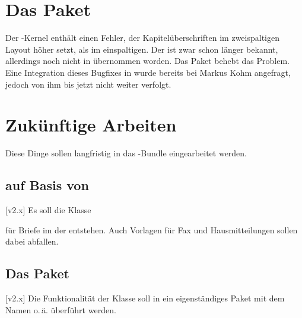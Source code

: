 \section{Das Paket }
%
%
%
Der -Kernel enthält einen Fehler, der Kapitelüberschriften im
zweispaltigen Layout höher setzt, als im einspaltigen. Der 
ist zwar schon länger bekannt, allerdings noch nicht in  
übernommen worden. Das Paket  behebt das Problem. Eine 
Integration dieses Bugfixes in \KOMAScript{} wurde bereits bei Markus Kohm 
angefragt, jedoch von ihm bis jetzt  
{nicht weiter verfolgt}.



\section{Zukünftige Arbeiten}
Diese Dinge sollen langfristig in das \TUDScript-Bundle eingearbeitet werden.
\subsection*{ auf Basis von }
[v2.x]
Es soll die Klasse
%
\begin{description}
  \item {}
\end{description}
%
für Briefe im \CD der \TnUD entstehen. Auch Vorlagen für Fax und 
Hausmitteilungen sollen dabei abfallen.
\subsection*{Das Paket }
[v2.x]
Die Funktionalität der Klasse  soll in ein eigenständiges 
Paket mit dem Namen  o.\,ä. überführt werden.